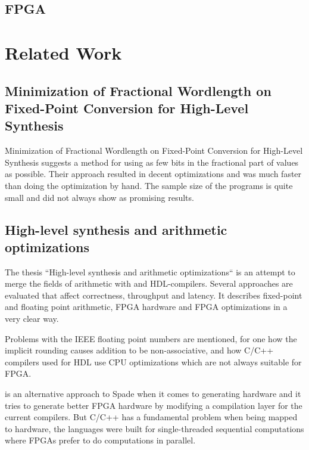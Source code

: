\documentclass[msc,lith,english]{liuthesis}
\begin{document}
\section{FPGA}


\chapter{Related Work}

\section{Minimization of Fractional Wordlength on Fixed-Point Conversion for High-Level Synthesis}
Minimization of Fractional Wordlength on Fixed-Point Conversion for High-Level Synthesis suggests a method for using as few bits in the fractional part of values as possible. Their approach resulted in decent optimizations and was much faster than doing the optimization by hand. The sample size of the programs is quite small and did not always show as promising results.

\cite{src:MinOfFrac}

\section{High-level synthesis and arithmetic optimizations}
The thesis ``High-level synthesis and arithmetic optimizations`` is an attempt to merge the fields of arithmetic with and HDL-compilers. Several approaches are evaluated that affect correctness, throughput and latency. It describes fixed-point and floating point arithmetic, FPGA hardware and FPGA optimizations in a very clear way.

Problems with the IEEE floating point numbers are mentioned, for one how the implicit rounding causes addition to be non-associative, and how C/C++ compilers used for HDL use CPU optimizations which are not always suitable for FPGA.

\citeauthor{src:HLSandOpt} is an alternative approach to Spade when it comes to generating hardware and it tries to generate better FPGA hardware by modifying a compilation layer for the current compilers. But C/C++ has a fundamental problem when being mapped to hardware, the languages were built for single-threaded sequential computations where FPGAs prefer to do computations in parallel.
\end{document}

